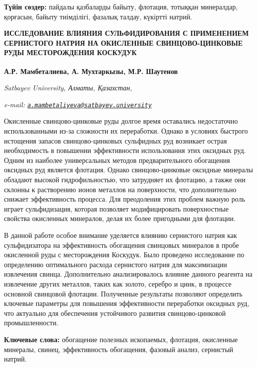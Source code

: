 {\bfseries Түйін сөздер:} пайдалы қазбаларды байыту, флотация, тотыққан
минералдар, қорғасын, байыту тиімділігі, фазалық талдау, күкіртті
натрий.

\begin{articleheader}
{\bfseries ИССЛЕДОВАНИЕ ВЛИЯНИЯ СУЛЬФИДИРОВАНИЯ С ПРИМЕНЕНИЕМ СЕРНИСТОГО НАТРИЯ НА ОКИСЛЕННЫЕ СВИНЦОВО-ЦИНКОВЫЕ РУДЫ МЕСТОРОЖДЕНИЯ КОСКУДУК}

{\bfseries
А.Р. Мамбеталиева\textsuperscript{\envelope },
А. Мухтаркызы,
М.Р. Шаутенов}
\end{articleheader}

\begin{affiliation}
\emph{Satbayev University, Алматы, Қазахстан,}

\emph{e-mail: \href{mailto:a.mambetaliyeva@satbayev.university}{\nolinkurl{a.mambetaliyeva@satbayev.university}}}
\end{affiliation}

Окисленные свинцово-цинковые руды долгое время оставались недостаточно
использованными из-за сложности их переработки. Однако в условиях
быстрого истощения запасов свинцово-цинковых сульфидных руд возникает
острая необходимость в повышении эффективности использования этих
оксидных руд. Одним из наиболее универсальных методов предварительного
обогащения оксидных руд является флотация. Однако свинцово-цинковые
оксидные минералы обладают высокой гидрофильностью, что затрудняет их
флотацию, а также они склонны к растворению ионов металлов на
поверхности, что дополнительно снижает эффективность процесса. Для
преодоления этих проблем важную роль играет сульфидизация, которая
позволяет модифицировать поверхностные свойства окисленных минералов,
делая их более пригодными для флотации.

В данной работе особое внимание уделяется влиянию сернистого натрия как
сульфидизатора на эффективность обогащения свинцовых минералов в пробе
окисленной руды с месторождения Коскудук. Было проведено исследование по
определению оптимального расхода сернистого натрия для максимизации
извлечения свинца. Дополнительно анализировалось влияние данного
реагента на извлечение других металлов, таких как золото, серебро и
цинк, в процессе основной свинцовой флотации. Полученные результаты
позволяют определить ключевые параметры для повышения эффективности
переработки оксидных руд, что актуально для обеспечения устойчивого
развития свинцово-цинковой промышленности.

{\bfseries Ключевые слова:} обогащение полезных ископаемых, флотация,
окисленные минералы, свинец, эффективность обогащения, фазовый анализ,
сернистый натрий.

